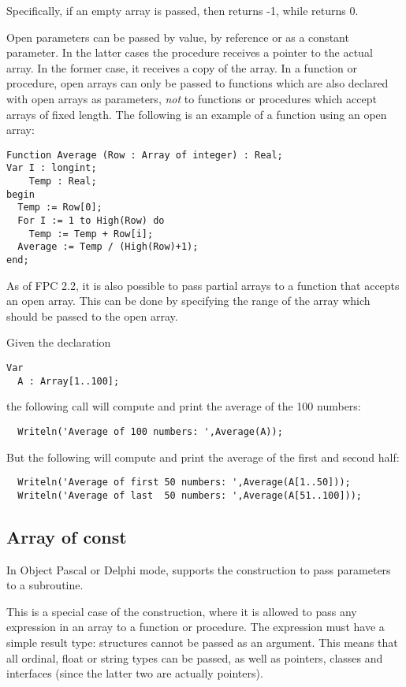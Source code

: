 Specifically, if an empty array is passed, then  returns -1,
while  returns 0.

Open parameters can be passed by value, by reference or as a constant
parameter. In the latter cases the procedure receives a pointer to the
actual array. In the former case, it receives a copy of the array.
In a function or procedure, open arrays can only be passed to functions which
are also declared with open arrays as parameters, {\em not} to functions or
procedures which accept arrays of fixed length.
The following is an example of a function using an open array:
\begin{verbatim}
Function Average (Row : Array of integer) : Real;
Var I : longint;
    Temp : Real;
begin
  Temp := Row[0];
  For I := 1 to High(Row) do
    Temp := Temp + Row[i];
  Average := Temp / (High(Row)+1);
end;
\end{verbatim}

As of FPC 2.2, it is also possible to pass partial arrays to a function that
accepts an open array. This can be done by specifying the range of the array
which should be passed to the open array.

Given the declaration
\begin{verbatim}
Var
  A : Array[1..100];
\end{verbatim}
the following call will compute and print the average of the 100 numbers:
\begin{verbatim}
  Writeln('Average of 100 numbers: ',Average(A));
\end{verbatim}
But the following will compute and print the average of the first and second
half:
\begin{verbatim}
  Writeln('Average of first 50 numbers: ',Average(A[1..50]));
  Writeln('Average of last  50 numbers: ',Average(A[51..100]));
\end{verbatim}

\subsection{Array of const}
In Object Pascal or Delphi mode, \fpc supports the 
construction to pass parameters to a subroutine.

This is a special case of the  construction, where it is
allowed to pass any expression in an array to a function or procedure.
The expression must have a simple result type: structures cannot be passed
as an argument. This means that all ordinal, float or string types can be
passed, as well as pointers, classes and interfaces (since the latter two
are actually pointers).

